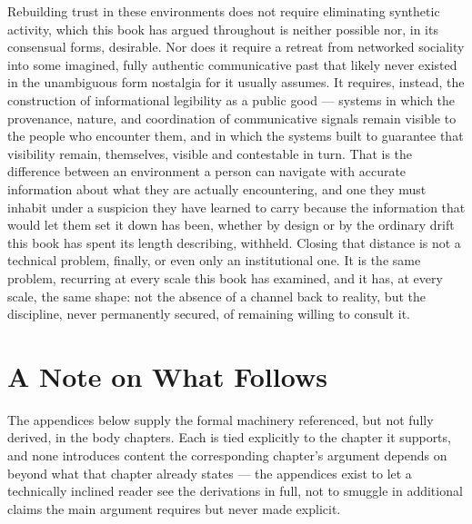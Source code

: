 \documentclass[12pt,a4paper]{book}
\begin{document}
Rebuilding trust in these environments does not require eliminating synthetic activity, which this book has argued throughout is neither possible nor, in its consensual forms, desirable. Nor does it require a retreat from networked sociality into some imagined, fully authentic communicative past that likely never existed in the unambiguous form nostalgia for it usually assumes. It requires, instead, the construction of informational legibility as a public good — systems in which the provenance, nature, and coordination of communicative signals remain visible to the people who encounter them, and in which the systems built to guarantee that visibility remain, themselves, visible and contestable in turn. That is the difference between an environment a person can navigate with accurate information about what they are actually encountering, and one they must inhabit under a suspicion they have learned to carry because the information that would let them set it down has been, whether by design or by the ordinary drift this book has spent its length describing, withheld. Closing that distance is not a technical problem, finally, or even only an institutional one. It is the same problem, recurring at every scale this book has examined, and it has, at every scale, the same shape: not the absence of a channel back to reality, but the discipline, never permanently secured, of remaining willing to consult it.



\appendix


\chapter*{A Note on What Follows}

The appendices below supply the formal machinery referenced, but not fully derived, in the body chapters. Each is tied explicitly to the chapter it supports, and none introduces content the corresponding chapter's argument depends on beyond what that chapter already states — the appendices exist to let a technically inclined reader see the derivations in full, not to smuggle in additional claims the main argument requires but never made explicit.
\end{document}
